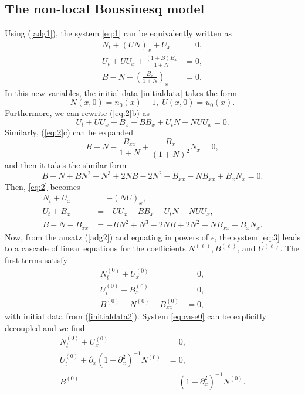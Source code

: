 \documentclass[final,11pt,a4paper,reqno]{amsart}
\theoremstyle{definition}
\begin{document}
\subsection{The non-local Boussinesq model}
Using (\ref{adg1}), the
system \eqref{eq:1} can be equivalently written as
\begin{subequations}\label{eq:2}
\begin{align}
N_t+(UN)_x+U_x&=0,\\
U_t+UU_x+\frac{(1+B)B_x}{1+N}&=0,\\
B-N-\left(\frac{B_x}{1+N}\right)_x&=0.
\end{align}
\end{subequations}
In this new variables, the initial data \eqref{initialdata} takes the form
\begin{equation}\label{initialdata2}
N(x,0)=n_{0}(x)-1,\;U(x,0)=u_{0}(x).
\end{equation}
Furthermore, we can rewrite (\ref{eq:2}b) as
$$
U_t+UU_x+B_x+BB_x+U_tN+NUU_x=0.
$$
Similarly, (\ref{eq:2}c) can be expanded
$$
B-N-\frac{B_{xx}}{1+N}+\frac{B_x}{(1+N)^2}N_x=0,
$$
and then it takes the similar form
$$
B-N+BN^2-N^3+2NB-2N^2-B_{xx}-NB_{xx}+B_xN_x=0.
$$
Then, \eqref{eq:2} becomes
\begin{subequations}\label{eq:3}
\begin{align}
N_t+U_x&=-(NU)_x,\\
U_t+B_x&=-UU_x-BB_x-U_tN-NUU_x,\\
B-N-B_{xx}&=-BN^2+N^3-2NB+2N^2+NB_{xx}-B_xN_x.
\end{align}
\end{subequations}
Now, from the ansatz (\ref{adg2})
and equating in powers of $\epsilon$, the system \eqref{eq:3} leads to a cascade of linear equations for the coefficients $N^{(\ell)},  B^{(\ell)}$, and $U^{(\ell)}$. The first terms satisfy
\begin{subequations}\label{eq:case0}
\begin{align}
N^{(0)}_t+U^{(0)}_x&=0,\\
U^{(0)}_t+B^{(0)}_x&=0,\\
B^{(0)}-N^{(0)}-B^{(0)}_{xx}&=0,
\end{align}
\end{subequations}
with initial data from (\ref{initialdata2}). System \eqref{eq:case0} can be explicitly decoupled and we find
\begin{subequations}\label{eq:case0b}
\begin{align}
N^{(0)}_t+U^{(0)}_x&=0,\\
U^{(0)}_t+\partial_x(1-\partial_x^2)^{-1}N^{(0)}&=0,\\
B^{(0)}&=(1-\partial_x^2)^{-1}N^{(0)}.
\end{align}
\end{subequations}
\end{document}
